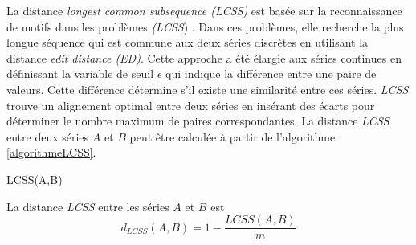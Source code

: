 La distance {\em longest common subsequence (LCSS)} est bas\'ee sur la reconnaissance de motifs dans les probl\`emes {\em (LCSS}) . Dans ces probl\`emes, elle recherche la plus longue s\'equence qui est commune aux deux s\'eries discr\`etes en utilisant la distance {\em edit distance (ED)}.
Cette approche a \'et\'e \'elargie aux s\'eries continues en d\'efinissant la variable de seuil $\epsilon$ qui indique la diff\'erence entre une paire de valeurs. Cette diff\'erence d\'etermine s'il existe une similarit\'e entre ces s\'eries. 
{\em LCSS} trouve un alignement optimal entre deux s\'eries en ins\'erant des \'ecarts pour d\'eterminer le nombre maximum de paires correspondantes.
La distance {\em LCSS} entre deux s\'eries $A$ et $B$ peut \^etre calcul\'ee \`a partir de l'algorithme \ref{algorithmeLCSS}.
 
\begin{algorithm}
\caption{LCSS(A,B)}
\label{algorithmeLCSS}
\begin{algorithmic}[1]
		\ENDIF
	\ENDFOR
\ENDFOR
{}
\end{algorithmic}
\end{algorithm}

La distance {\em LCSS} entre les s\'eries $A$ et $B$ est 
$$
d_{LCSS}(A,B) = 1 - \frac{LCSS(A,B)}{m}
$$
